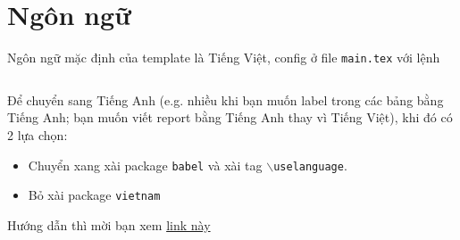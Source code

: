 \section{Ngôn ngữ}
Ngôn ngữ mặc định của template là Tiếng Việt, config ở file \texttt{main.tex} với lệnh
\begin{lstlisting}[language=tex]
% \usepackage[utf8]{vietnam}
\end{lstlisting}
Để chuyển sang Tiếng Anh (e.g. nhiều khi bạn muốn label trong các bảng bằng Tiếng Anh; bạn muốn viết report bằng Tiếng Anh thay vì Tiếng Việt), khi đó có 2 lựa chọn:
\begin{itemize}
\item Chuyển xang xài package \texttt{babel} và xài tag \texttt{$\backslash$uselanguage}.
\item Bỏ xài package \texttt{vietnam}
\end{itemize}
Hướng dẫn thì mời bạn xem \href{https://www.overleaf.com/learn/latex/International_language_support#Babel}{link này}